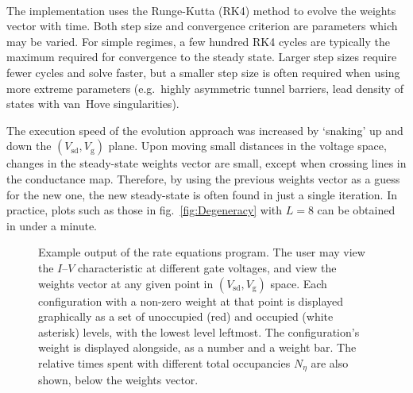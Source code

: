 \documentclass[a4paper,11pt]{article}
\let\oldcite\cite
\renewcommand{\cite}[1]{\textsuperscript{\oldcite{#1}}}
\begin{document}
    The implementation uses the Runge-Kutta (RK4) method\cite{Weisstein-2015} to evolve the weights vector with time. Both step size and convergence criterion are parameters which may be varied. For simple regimes, a few hundred RK4 cycles are typically the maximum required for convergence to the steady state. Larger step sizes require fewer cycles and solve faster, but a smaller step size is often required when using more extreme parameters (e.g.\ highly asymmetric tunnel barriers, lead density of states with van~Hove singularities).

    The execution speed of the evolution approach was increased by `snaking' up and down the $\left(V_\mathrm{sd},V_\mathrm{g}\right)$ plane. Upon moving small distances in the voltage space, changes in the steady-state weights vector are small, except when crossing lines in the conductance map. Therefore, by using the previous weights vector as a guess for the new one, the new steady-state is often found in just a single iteration. In practice, plots such as those in fig.~\ref{fig:Degeneracy} with $L = 8$ can be obtained in under a minute. 

    \begin{figure}
        \caption{Example output of the rate equations program. The user may view the $I$--$V$ characteristic at different gate voltages, and view the weights vector at any given point in $\left(V_\mathrm{sd},V_\mathrm{g}\right)$ space. Each configuration with a non-zero weight at that point is displayed graphically as a set of unoccupied (red) and occupied (white asterisk) levels, with the lowest level leftmost. The configuration's weight is displayed alongside, as a number and a weight bar. The relative times spent with different total occupancies $N_\eta$ are also shown, below the weights vector.}
        \label{fig:Example_output}
    \end{figure}
\end{document}
